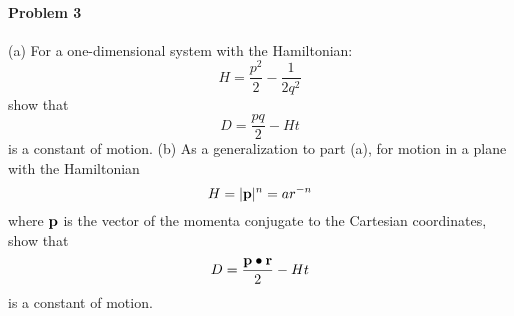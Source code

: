\documentclass[11pt,a4paper]{report}
\begin{document}
\paragraph{Problem 3} 
(a) For a one-dimensional system with the Hamiltonian:
\begin{equation}
H=\dfrac{p^2}{2} - \dfrac{1}{2q^2}
\end{equation}
show that 
\begin{equation}
D=\dfrac{pq}{2}-Ht
\end{equation}
is a constant of motion.
(b) As a generalization to part (a), for motion in a plane with the Hamiltonian
\begin{equation}
H=|\bold{p}|^n=ar^{-n}
\end{equation}
where $\bold{p}$ is the vector of the momenta conjugate to the Cartesian coordinates, show that 
\begin{equation}
D=\dfrac{\bold{p\bullet r}}{2}-Ht
\end{equation}
is a constant of motion.
\end{document}
